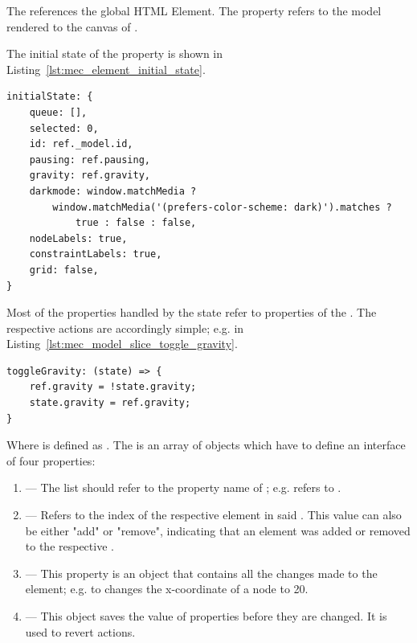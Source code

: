 
The  references the global  HTML Element.
The  property refers to the  model rendered to the canvas of .

The initial state of the  property is shown in Listing~\ref{lst:mec_element_initial_state}.

\begin{lstlisting}[label={lst:mec_element_initial_state}, caption={\code{initialState} property of \code{MecModel}.}]
initialState: {
    queue: [],
    selected: 0,
    id: ref._model.id,
    pausing: ref.pausing,
    gravity: ref.gravity,
    darkmode: window.matchMedia ?
        window.matchMedia('(prefers-color-scheme: dark)').matches ?
            true : false : false,
    nodeLabels: true,
    constraintLabels: true,
    grid: false,
}
\end{lstlisting}

Most of the properties handled by the state refer to properties of the .
The respective actions are accordingly simple; e.g.  in Listing~\ref{lst:mec_model_slice_toggle_gravity}.

\begin{lstlisting}[label={lst:mec_model_slice_toggle_gravity}, caption={\code{toggleGravity} property in \code{MecModel}s \code{reducer}}]
toggleGravity: (state) => {
    ref.gravity = !state.gravity;
    state.gravity = ref.gravity;
}
\end{lstlisting}

Where  is defined as .
The  is an array of objects which have to define an interface of four properties:

\begin{enumerate}
    \item {} --- The list should refer to the property name of ; e.g.  refers to .
    \item {} --- Refers to the index of the respective element in said . This value can also be either "add" or "remove", indicating that an element was added or removed to the respective .
    \item {} --- This property is an object that contains all the changes made to the element; e.g.  to changes the x-coordinate of a node to 20.
    \item {} --- This object saves the value of properties before they are changed. It is used to revert actions.
\end{enumerate}

